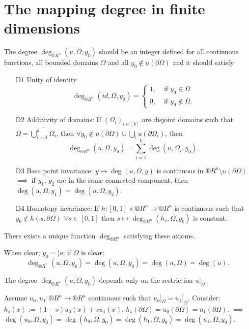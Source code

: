\documentclass[12pt]{article}					%
\begin{document}
\section{The mapping degree in finite dimensions}
\begin{definice}
	The degree $\deg_{®R^n}(u, Ω, y_0)$ should be an integer defined for all continuous functions, all bounded domains $Ω$ and all $y_0 \notin u(\partial Ω)$ and it should satisfy
	\begin{itemize}
		\item[D1] Unity of identity
			$$ \deg_{®R^n}(id, Ω, y_0) = \begin{cases}1, & \text{ if } y_0 \in Ω\\0, & \text{ if } y_0 \notin \overline{Ω}.\end{cases} $$
		\item[D2] Additivity of domains: If $(Ω_i)_{i \in [k]}$ are disjoint domains such that $\overline{Ω} = \overline{\bigcup_{i=1}^k Ω_i}$, then $\forall y_0 \notin u(\partial Ω) \cup \bigcup_i u(\partial Ω_i)$, then
			$$ \deg_{®R^n}(u, Ω, y_0) = \sum_{i=1}^k \deg(u, Ω_i, y_0). $$
		\item[D3] Base point invariance: $y \mapsto \deg(u, Ω, y)$ is continuous in $®R^n \setminus u(\partial Ω)$ $\implies$ if $y_1$, $y_2$ are in the same connected component, then $\deg(u, Ω, y_1) = \deg(u, Ω, y_2)$.
		\item[D4] Homotopy invariance: If $h: [0, 1] \times ®R^n \rightarrow ®R^n$ is continuous such that $y_0 \notin h(s, \partial Ω)$ $\forall s \in [0, 1]$ then $s \mapsto \deg_{®R^n}(h_s, Ω, y_0)$ is constant.
	\end{itemize}
\end{definice}

\begin{veta}[$C^0$-degree]
	There exists a unique function $\deg_{®R^n}$ satisfying these axioms.

	\begin{poznamkain}[Notation]
		When clear; $y_0 = ¦o$; if $Ω$ is clear:
		$$ \deg_{®R^n}(u, Ω, y_0) = \deg(u, Ω, y_0) = \deg(u, Ω) = \deg(u). $$
	\end{poznamkain}
\end{veta}

\begin{lemma}
	The degree $\deg_{®R^n}(u, Ω, y_0)$ depends only on the restriction $u|_{\overline{Ω}}$.

	\begin{dukazin}
		Assume $u_0, u_1: ®R^n \rightarrow ®R^n$ continuous such that $u_0|_{\overline{Ω}} = u_1|_{\overline{Ω}}$. Consider: $h_s(x) := (1 - s) u_0(x) + s u_1(x)$. $h_s(\partial Ω) = u_0(\partial Ω) = u_1(\partial Ω)$. $\implies$ $\deg(u_0, Ω, y_0) = \deg(h_0, Ω, y_0) = \deg(h_1, Ω, y_0) = \deg(u_1, Ω, y_0)$.
	\end{dukazin}
\end{lemma}
\end{document}
